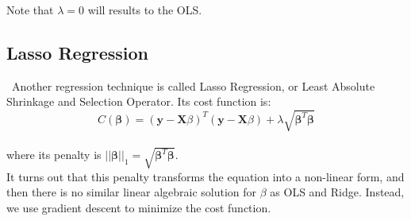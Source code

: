 Note that $\lambda=0$ will results to the OLS.\\

\subsection{Lasso Regression}
\label{chap:Lasso Regression}

\quad \, Another regression technique is called Lasso Regression, or Least Absolute Shrinkage and Selection Operator. Its cost function is:\\

$$C(\boldsymbol{\beta}) = (\boldsymbol{y} - \boldsymbol{X}\beta)^T(\boldsymbol{y} - \boldsymbol{X}\beta) + \lambda \sqrt{\boldsymbol{\beta}^T\boldsymbol{\beta}}$$\\

\noindent where its penalty is $||\boldsymbol{\beta}||_1 = \sqrt{\boldsymbol{\beta}^T\boldsymbol{\beta}}$.\\

It turns out that this penalty transforms the equation into a non-linear form, and then there is no similar linear algebraic solution for $\beta$ as OLS and Ridge. Instead, we use gradient descent to minimize the cost function. \\
